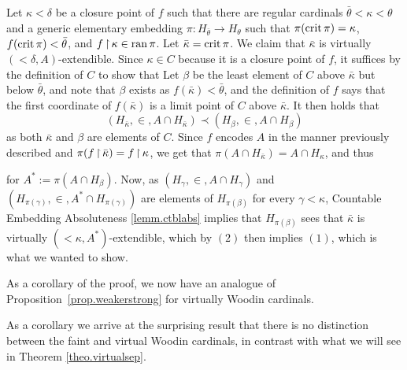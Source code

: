 \documentclass[../../main]{subfiles}
\begin{document}
{  \qquad Let $\kappa<\delta$ be a closure point of $f$ such that there are regular cardinals $\bar\theta<\kappa<\theta$ and a generic elementary embedding $\pi\colon H_{\bar\theta}\to H_\theta$ such that $\pi(\operatorname{crit}\pi)=\kappa$, $f(\operatorname{crit}\pi)<\bar\theta$, and $f\operatorname{\upharpoonright}\kappa\in\operatorname{ran}\pi$. Let $\bar\kappa=\operatorname{crit} \pi$. We claim that $\bar\kappa$ is virtually $({<}\delta, A)$-extendible. Since $\kappa\in C$ because it is a closure point of $f$, it suffices by the definition of $C$ to show that
 Let $\beta$ be the least element of $C$ above $\bar\kappa$ but below $\bar\theta$, and note that $\beta$ exists as $f(\bar\kappa)<\bar\theta$, and the definition of $f$ says that the first coordinate of $f(\bar\kappa)$ is a limit point of $C$ above $\bar\kappa$. It then holds that $$(H_{\bar\kappa},\in,A\cap H_{\bar\kappa}) \prec (H_\beta,\in,A\cap H_\beta)$$ as both $\bar\kappa$ and $\beta$ are elements of $C$. Since $f$ encodes $A$ in the manner previously described and $\pi(f\operatorname{\upharpoonright}\bar\kappa)=f\operatorname{\upharpoonright}\kappa$, we get that $\pi(A\cap H_{\bar\kappa}) = A\cap H_\kappa$, and thus

  for $A^* := \pi(A\cap H_\beta)$. Now, as $(H_\gamma,\in, A\cap H_\gamma)$ and $(H_{\pi(\gamma)},\in,A^*\cap H_{\pi(\gamma)})$ are elements of $H_{\pi(\beta)}$ for every $\gamma<\kappa$, Countable Embedding Absoluteness \ref{lemm.ctblabs} implies that $H_{\pi(\beta)}$ sees that $\bar\kappa$ is virtually $({<}\kappa, A^*)$-extendible, which by $(2)$ then implies $(1)$, which is what we wanted to show.
}

As a corollary of the proof, we now have an analogue of Proposition~\ref{prop.weakerstrong} for virtually Woodin cardinals.


As a corollary we arrive at the surprising result that there is no distinction between the faint and virtual Woodin cardinals, in contrast with what we will see in Theorem \ref{theo.virtualsep}.

\end{document}
